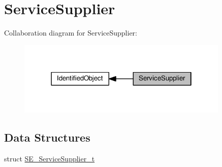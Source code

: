 \hypertarget{group__ServiceSupplier}{}\section{Service\+Supplier}
\label{group__ServiceSupplier}
Collaboration diagram for Service\+Supplier\+:\nopagebreak
\begin{figure}[H]
\begin{center}
\leavevmode
\includegraphics[width=286pt]{group__ServiceSupplier}
\end{center}
\end{figure}
\subsection*{Data Structures}
\begin{DoxyCompactItemize}
\item 
struct \hyperlink{structSE__ServiceSupplier__t}{S\+E\+\_\+\+Service\+Supplier\+\_\+t}
\end{DoxyCompactItemize}

